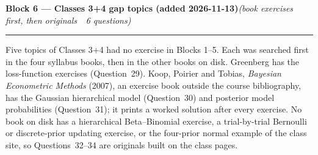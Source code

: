 \documentclass[11pt,a4paper]{article}
\newcommand{\bloco}[3]{\bigskip\noindent
  {\large\bfseries\color{blue!55!black}Block #1 --- #2}\hfill\textit{(#3)}\par
  \noindent\rule{\linewidth}{0.3pt}\smallskip}
\begin{document}
\bloco{6}{Classes 3+4 gap topics (added 2026-11-13)}{book exercises first, then originals \,\textbullet\, 6 questions}

{\footnotesize\noindent Five topics of Classes 3+4 had no exercise in Blocks 1--5. Each was searched first in the four
syllabus books, then in the other books on disk. Greenberg has the loss-function exercises (Question~29). Koop, Poirier
and Tobias, \textit{Bayesian Econometric Methods} (2007), an exercise book outside the course bibliography, has the
Gaussian hierarchical model (Question~30) and posterior model probabilities (Question~31); it prints a worked solution
after every exercise. No book on disk has a hierarchical Beta--Binomial exercise, a trial-by-trial Bernoulli or
discrete-prior updating exercise, or the four-prior normal example of the class site, so Questions~32--34 are
originals built on the class pages.\par}
\end{document}
